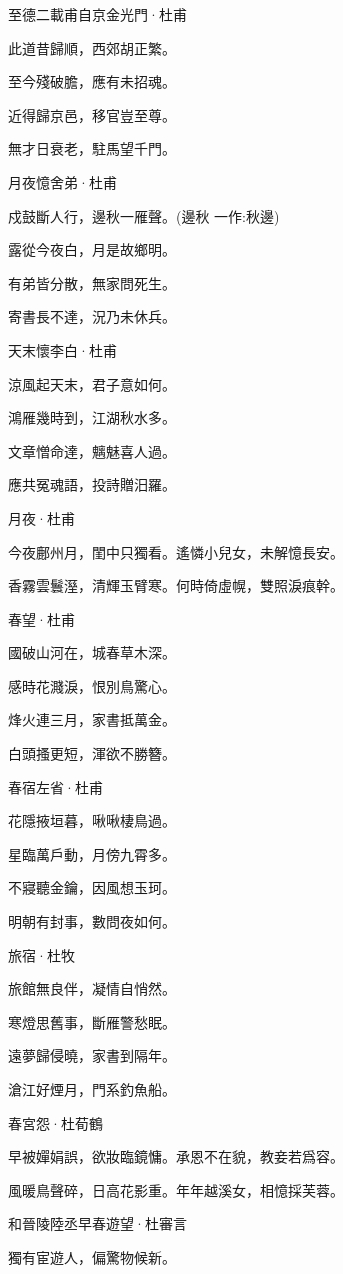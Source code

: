 \documentclass[12pt,a4paper]{ctexbook}
\begin{document}
至德二載甫自京金光門·杜甫\par
此道昔歸順，西郊胡正繁。\par
至今殘破膽，應有未招魂。\par
近得歸京邑，移官豈至尊。\par
無才日衰老，駐馬望千門。\par
月夜憶舍弟·杜甫\par
戍鼓斷人行，邊秋一雁聲。(邊秋 一作:秋邊)\par
露從今夜白，月是故鄉明。\par
有弟皆分散，無家問死生。\par
寄書長不達，況乃未休兵。\par
天末懷李白·杜甫\par
涼風起天末，君子意如何。\par
鴻雁幾時到，江湖秋水多。\par
文章憎命達，魑魅喜人過。\par
應共冤魂語，投詩贈汨羅。\par
月夜·杜甫\par
今夜鄜州月，閨中只獨看。遙憐小兒女，未解憶長安。\par
香霧雲鬟溼，清輝玉臂寒。何時倚虛幌，雙照淚痕幹。\par
春望·杜甫\par
國破山河在，城春草木深。\par
感時花濺淚，恨別鳥驚心。\par
烽火連三月，家書抵萬金。\par
白頭搔更短，渾欲不勝簪。\par
春宿左省·杜甫\par
花隱掖垣暮，啾啾棲鳥過。\par
星臨萬戶動，月傍九霄多。\par
不寢聽金鑰，因風想玉珂。\par
明朝有封事，數問夜如何。\par
旅宿·杜牧\par
旅館無良伴，凝情自悄然。\par
寒燈思舊事，斷雁警愁眠。\par
遠夢歸侵曉，家書到隔年。\par
滄江好煙月，門系釣魚船。\par
春宮怨·杜荀鶴\par
早被嬋娟誤，欲妝臨鏡慵。承恩不在貌，教妾若爲容。\par
風暖鳥聲碎，日高花影重。年年越溪女，相憶採芙蓉。\par
和晉陵陸丞早春遊望·杜審言\par
獨有宦遊人，偏驚物候新。\par
\end{document}
